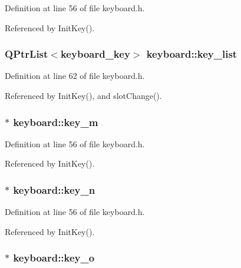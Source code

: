 Definition at line 56 of file keyboard.h.

Referenced by Init\-Key().
\subsubsection{\setlength{\rightskip}{0pt plus 5cm}QPtr\-List$<${\bf keyboard\_\-key}$>$ {\bf keyboard::key\_\-list}\hspace{0.3cm}{\tt  [private]}}\label{classkeyboard_keyboardr45}




Definition at line 62 of file keyboard.h.

Referenced by Init\-Key(), and slot\-Change().
\subsubsection{ $\ast$ {\bf keyboard::key\_\-m}\hspace{0.3cm}{\tt  [private]}}\label{classkeyboard_keyboardr12}




Definition at line 56 of file keyboard.h.

Referenced by Init\-Key().
\subsubsection{ $\ast$ {\bf keyboard::key\_\-n}\hspace{0.3cm}{\tt  [private]}}\label{classkeyboard_keyboardr13}




Definition at line 56 of file keyboard.h.

Referenced by Init\-Key().
\subsubsection{ $\ast$ {\bf keyboard::key\_\-o}\hspace{0.3cm}{\tt  [private]}}\label{classkeyboard_keyboardr14}




